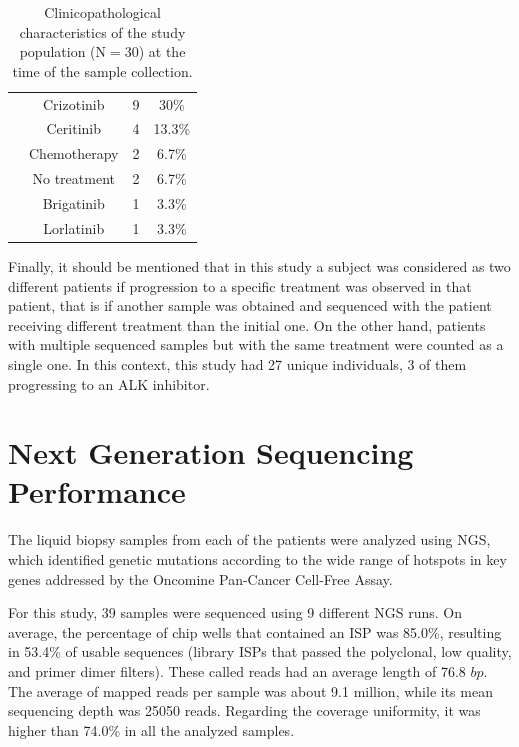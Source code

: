\begin{table}[t]
{\begin{tabular}{cccc}
\rowcolor[HTML]{FFFFFF}
\cellcolor[HTML]{FFFFFF} & Crizotinib & 9 & 30\% \\
\rowcolor[HTML]{FFFFFF}
\cellcolor[HTML]{FFFFFF} & Ceritinib & 4 & 13.3\% \\
\rowcolor[HTML]{FFFFFF}
\cellcolor[HTML]{FFFFFF} & Chemotherapy & 2 & 6.7\% \\
\rowcolor[HTML]{FFFFFF}
\cellcolor[HTML]{FFFFFF} & No treatment & 2 & 6.7\% \\
\rowcolor[HTML]{FFFFFF}
\cellcolor[HTML]{FFFFFF} &  Brigatinib & 1 & 3.3\% \\
\rowcolor[HTML]{FFFFFF}
\multirow{-7}{*}{\cellcolor[HTML]{FFFFFF}\textbf{Treatment}} & Lorlatinib & 1 & 3.3\%
\end{tabular}}
\caption{Clinicopathological characteristics of the study population (N$=$30) at the time of the sample collection.}
\label{tab:Patients}
\end{table}

Finally, it should be mentioned that in this study a subject was considered as two different patients if progression to a specific treatment was observed in that patient, that is if another sample was obtained and sequenced with the patient receiving different treatment than the initial one. On the other hand, patients with multiple sequenced samples but with the same treatment were counted as a single one. In this context, this study had 27 unique individuals, 3 of them progressing to an ALK inhibitor.

\section{Next Generation Sequencing Performance}

The liquid biopsy samples from each of the patients were analyzed using NGS, which identified genetic mutations according to the wide range of hotspots in key genes addressed by the Oncomine\texttrademark{} Pan-Cancer Cell-Free Assay.

For this study, 39 samples were sequenced using 9 different NGS runs. On average, the percentage of chip wells that contained an ISP was 85.0\%, resulting in 53.4\% of usable sequences (library ISPs that passed the polyclonal, low quality, and primer dimer filters). These called reads had an average length of 76.8 $bp$. The average of mapped reads per sample was about 9.1 million, while its mean sequencing depth was 25050 reads. Regarding the coverage uniformity, it was higher than 74.0\% in all the analyzed samples.

